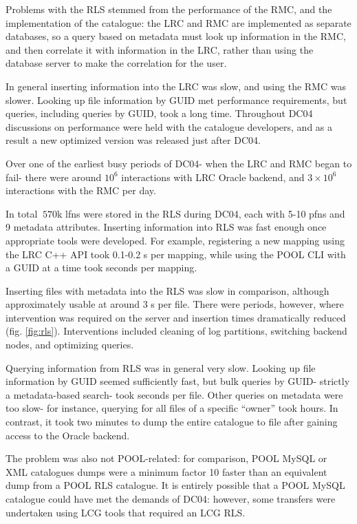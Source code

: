 \documentclass{cmspaper}
\begin{document}
Problems with the RLS stemmed from the performance of the RMC, and the
implementation of the catalogue: the LRC and RMC are implemented as
separate databases, so a query based on metadata must look up
information in the RMC, and then correlate it with information in the
LRC, rather than using the database server to make the correlation for
the user.

In general inserting information into the LRC was slow, and using the
RMC was slower. Looking up file information by GUID met performance
requirements, but queries, including queries by GUID, took a long
time. Throughout DC04 discussions on performance were held with the
catalogue developers, and as a result a new optimized version was
released just after DC04.

Over one of the earliest busy periods of DC04- when the LRC and RMC
began to fail- there were around $10^6$ interactions with LRC Oracle
backend, and $3\times10^6$ interactions with the RMC per day.

In total $~570$k lfns were stored in the RLS during DC04, each with
5-10 pfns and 9 metadata attributes. Inserting information into RLS
was fast enough once appropriate tools were developed. For example,
registering a new mapping using the LRC C++ API took 0.1-0.2 s per
mapping, while using the POOL CLI with a GUID at a time took seconds
per mapping.

Inserting files with metadata into the RLS was slow in comparison,
although approximately usable at around 3 s per file. There were
periods, however, where intervention was required on the server and
insertion times dramatically reduced
(fig. \ref{fig:rls}). Interventions included cleaning of log
partitions, switching backend nodes, and optimizing queries.

Querying information from RLS was in general very slow. Looking up
file information by GUID seemed sufficiently fast, but bulk queries by
GUID- strictly a metadata-based search- took seconds per file. Other
queries on metadata were too slow- for instance, querying for all
files of a specific ``owner'' took hours. In contrast, it took two
minutes to dump the entire catalogue to file after gaining access to
the Oracle backend.

The problem was also not POOL-related: for comparison, POOL MySQL or
XML catalogues dumps were a minimum factor 10 faster than an
equivalent dump from a POOL RLS catalogue. It is entirely possible
that a POOL MySQL catalogue could have met the demands of DC04:
however, some transfers were undertaken using LCG tools that required
an LCG RLS.
\end{document}
